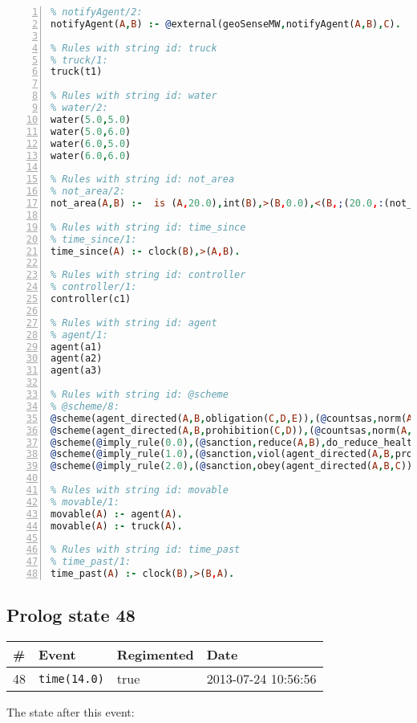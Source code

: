 \documentclass[11pt]{article}\usepackage[utf8]{inputenc}\usepackage{geometry}
\begin{document}
\begin{lstlisting}[language=Prolog, numbers=left]
% Rules with string id: notifyAgent
% notifyAgent/2:
notifyAgent(A,B) :- @external(geoSenseMW,notifyAgent(A,B),C).

% Rules with string id: truck
% truck/1:
truck(t1)

% Rules with string id: water
% water/2:
water(5.0,5.0)
water(5.0,6.0)
water(6.0,5.0)
water(6.0,6.0)

% Rules with string id: not_area
% not_area/2:
not_area(A,B) :-  is (A,20.0),int(B),>(B,0.0),<(B,;(20.0,:(not_area(A,B), is (-(B),20.0)))),int(A),>(A,0.0),<(A,;(20.0,:(area(A,B),-(int(A))))),int(B),>(A,0.0),>(B,0.0),<(A,21.0),<(B,21.0).

% Rules with string id: time_since
% time_since/1:
time_since(A) :- clock(B),>(A,B).

% Rules with string id: controller
% controller/1:
controller(c1)

% Rules with string id: agent
% agent/1:
agent(a1)
agent(a2)
agent(a3)

% Rules with string id: @scheme
% @scheme/8:
@scheme(agent_directed(A,B,obligation(C,D,E)),(@countsas,norm(A,B,F,obligation(C,D,E)),F),false,(listTrue(C)),(time_past(D)),false,[plus(viol(agent_directed(A,B,obligation(C,D,E))))|[]],[plus(obey(agent_directed(A,B,obligation(C,D,E))))|[]])
@scheme(agent_directed(A,B,prohibition(C,D)),(@countsas,norm(A,B,E,prohibition(C,D)),E),(listTrue(C)),false,(false),false,[plus(viol(agent_directed(A,B,prohibition(C,D))))|[]],[plus(obey(agent_directed(A,B,prohibition(C,D))))|[]])
@scheme(@imply_rule(0.0),(@sanction,reduce(A,B),do_reduce_health(A,B),notifyAgent(A,changed(status))),true,false,false,false,[min(reduce(A,B))|[]],[])
@scheme(@imply_rule(1.0),(@sanction,viol(agent_directed(A,B,prohibition(C,D))),do_sanction(D)),true,false,false,false,[min(viol(agent_directed(A,B,prohibition(C,D))))|[]],[])
@scheme(@imply_rule(2.0),(@sanction,obey(agent_directed(A,B,C))),true,false,false,false,[min(obey(agent_directed(A,B,C)))|[]],[])

% Rules with string id: movable
% movable/1:
movable(A) :- agent(A).
movable(A) :- truck(A).

% Rules with string id: time_past
% time_past/1:
time_past(A) :- clock(B),>(B,A).

\end{lstlisting}
\clearpage 
\subsection{Prolog state 48}
\begin{table}[ht]
\centering 
\begin{tabular}{l l l l} 
\textbf{\#} & \textbf{Event} & \textbf{Regimented} & \textbf{Date} \\ [0.5ex] 
\hline
48&\texttt{time(14.0)}&true&2013-07-24 10:56:56\\ [1ex] \hline\end{tabular}
\end{table}
The state after this event:
\end{document}
